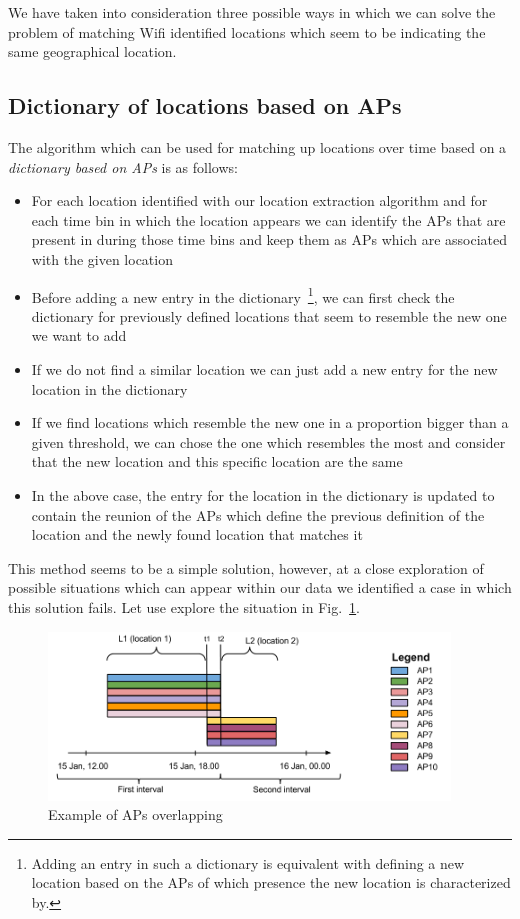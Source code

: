 We have taken into consideration three possible ways in which we can solve the
problem of matching Wifi identified locations which seem to be indicating the
same geographical location.

\subsection{Dictionary of locations based on APs}
\label{dictionary_aps}
The algorithm which can be used for matching up locations over time based on a
\textit{dictionary based on APs} is as follows:
\begin{itemize}
  \item For each location identified with our location extraction algorithm and
  for each time bin in which the location appears we can identify the APs that
  are present in during those time bins and keep them as APs which are
  associated with the given location
  \item Before adding a new entry in the dictionary~\footnote{Adding an entry
  in such a dictionary is equivalent with defining a new location based on the
  APs of which presence the new location is characterized by.}, we can first
  check the dictionary for previously defined locations that seem to resemble
  the new one we want to add
  \item If we do not find a similar location we can just add a new entry for the
  new location in the dictionary
  \item If we find locations which resemble the new one in a proportion bigger
  than a given threshold, we can chose the one which resembles the most and
  consider that the new location and this specific location are the same
  \item In the above case, the entry for the location in the dictionary is
  updated to contain the reunion of the APs which define the previous definition
  of the location and the newly found location that matches it
\end{itemize}

This method seems to be a simple solution, however, at a close exploration of
possible situations which can appear within our data we identified a case in
which this solution fails. Let use explore the situation in
Fig.~\ref{overlap_of_aps}. 

\begin{figure}[!h]
\centering
\includegraphics[width=0.95\textwidth]{figures/matching/overlap_of_aps.png}
\caption{Example of APs overlapping}
\label{overlap_of_aps}
\end{figure}

